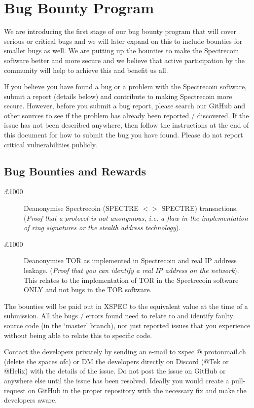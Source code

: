 \chapter{Bug Bounty Program}
We are introducing the first stage of our bug bounty program that will cover 
serious or critical bugs and we will later expand on this to include bounties 
for smaller bugs as well. We are putting up the bounties to make the 
Spectrecoin software better and more secure and we believe that active 
participation by the community will help to achieve this and benefit us all.



If you believe you have found a bug or a problem with the Spectrecoin 
software, submit a report (details below) and contribute to making 
Spectrecoin more secure. However, before you submit a bug report, please 
search our GitHub and other sources to see if the problem has already 
been reported / discovered. If the issue has not been described anywhere, 
then follow the instructions at the end of this document for how to submit 
the bug you have found. Please do not report critical vulnerabilities 
publicly.



\section{Bug Bounties and Rewards}
\begin{description}
	\item[£1000] Deanonymise Spectrecoin (SPECTRE $<>$ SPECTRE) 
	transactions. (\textit{Proof that a protocol is not anonymous, 
	i.e. a flaw in the implementation of ring signatures or the stealth 
	address technology}).
	\item[£1000] Deanonymise TOR as implemented in Spectrecoin and real 
	IP address leakage. (\textit{Proof that you can identify a real IP 
	address on the network}). This relates to the implementation of TOR 
	in the Spectrecoin software ONLY and not bugs in the TOR software.
\end{description}



The bounties will be paid out in XSPEC to the equivalent value at the time 
of a submission. All the bugs / errors found need to relate to and identify 
faulty source code (in the ‘master’ branch), not just reported issues that 
you experience without being able to relate this to specific code. 



Contact the developers privately by sending an e-mail to xspec @ protonmail.ch 
(delete the spaces ofc) or DM the developers directly on Discord (@Tek or 
@Helix) with the details of the issue. Do not post the issue on GitHub or 
anywhere else until the issue has been resolved. Ideally you would create 
a pull-request on GitHub in the proper repository with the necessary fix 
and make the developers aware.
